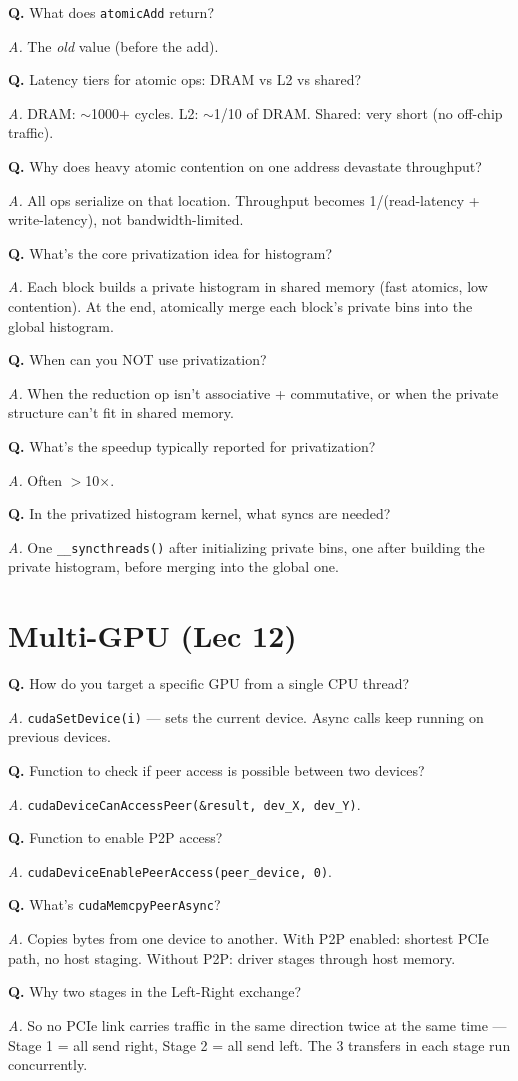 \documentclass[10pt]{article}
\newcommand{\q}[1]{\par\vspace{6pt}\noindent\textbf{Q.} #1}
\newcommand{\ans}[1]{\par\noindent\textit{A.} #1\par}
\begin{document}
\q{What does \texttt{atomicAdd} return?}
\ans{The \emph{old} value (before the add).}

\q{Latency tiers for atomic ops: DRAM vs L2 vs shared?}
\ans{DRAM: $\sim$1000+ cycles. L2: $\sim$1/10 of DRAM. Shared: very short (no off-chip traffic).}

\q{Why does heavy atomic contention on one address devastate throughput?}
\ans{All ops serialize on that location. Throughput becomes 1/(read-latency + write-latency), not bandwidth-limited.}

\q{What's the core privatization idea for histogram?}
\ans{Each block builds a private histogram in shared memory (fast atomics, low contention). At the end, atomically merge each block's private bins into the global histogram.}

\q{When can you NOT use privatization?}
\ans{When the reduction op isn't associative + commutative, or when the private structure can't fit in shared memory.}

\q{What's the speedup typically reported for privatization?}
\ans{Often $>$10$\times$.}

\q{In the privatized histogram kernel, what syncs are needed?}
\ans{One \texttt{\_\_syncthreads()} after initializing private bins, one after building the private histogram, before merging into the global one.}

\hrulefill

\section*{Multi-GPU (Lec 12)}

\q{How do you target a specific GPU from a single CPU thread?}
\ans{\texttt{cudaSetDevice(i)} — sets the current device. Async calls keep running on previous devices.}

\q{Function to check if peer access is possible between two devices?}
\ans{\texttt{cudaDeviceCanAccessPeer(\&result, dev\_X, dev\_Y)}.}

\q{Function to enable P2P access?}
\ans{\texttt{cudaDeviceEnablePeerAccess(peer\_device, 0)}.}

\q{What's \texttt{cudaMemcpyPeerAsync}?}
\ans{Copies bytes from one device to another. With P2P enabled: shortest PCIe path, no host staging. Without P2P: driver stages through host memory.}

\q{Why two stages in the Left-Right exchange?}
\ans{So no PCIe link carries traffic in the same direction twice at the same time — Stage 1 = all send right, Stage 2 = all send left. The 3 transfers in each stage run concurrently.}
\end{document}
